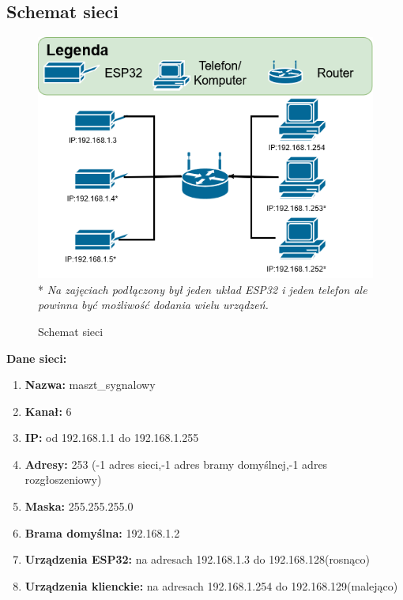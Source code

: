 \documentclass{article}
\begin{document}
        \subsection{Schemat sieci}
            \begin{figure}[ht]
                \centering
                \includegraphics[width=\textwidth]{images/SiecUp.png}
                * \textit{Na zajęciach podłączony był jeden układ ESP32 i jeden telefon ale
                powinna być możliwość dodania wielu urządzeń.}
                \caption{Schemat sieci}
                \label{fig:WiFiScheme}
            \end{figure}
            \FloatBarrier
            \textbf{Dane sieci:}
            \begin{enumerate}
                \item \textbf{Nazwa:} maszt\_sygnalowy
                \item \textbf{Kanał:} 6
                \item \textbf{IP:} od 192.168.1.1 do 192.168.1.255
                \item \textbf{Adresy:} 253 (-1 adres sieci,-1 adres bramy domyślnej,-1 adres rozgłoszeniowy) 
                \item \textbf{Maska:} 255.255.255.0
                \item \textbf{Brama domyślna:} 192.168.1.2
                \item \textbf{Urządzenia ESP32:} na adresach 192.168.1.3 do 192.168.128(rosnąco)
                \item \textbf{Urządzenia klienckie:} na adresach 192.168.1.254 do 192.168.129(malejąco)
            \end{enumerate}
\end{document}
